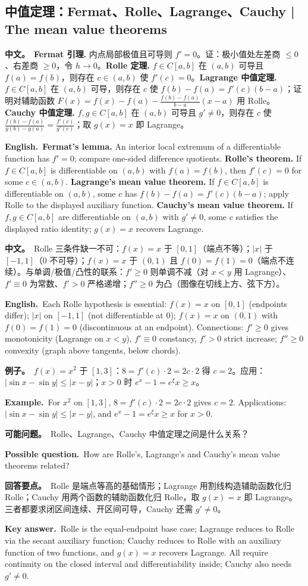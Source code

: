 \documentclass[UTF8,11pt,a4paper]{ctexart}
\newcommand{\BOTH}[2]{\par\noindent\textbf{中文。}\ #1\par\noindent\textbf{English.}\ #2\par}
\newcommand{\EX}[2]{\par\noindent\textbf{例子。}\ #1\par\noindent\textbf{Example.}\ #2\par}
\newcommand{\ASK}[4]{\begin{samepage}\par\noindent\textbf{可能问题。}\ #1\par\noindent\textbf{Possible question.}\ #2\par\noindent\textbf{回答要点。}\ #3\par\noindent\textbf{Key answer.}\ #4\medskip\end{samepage}}
\begin{document}
\subsection{中值定理：Fermat、Rolle、Lagrange、Cauchy | The mean value theorems}
\BOTH{\textbf{Fermat 引理.} 内点局部极值且可导则 $f'=0$。证：极小值处左差商 $\le0$、右差商 $\ge0$，令 $h\to0$。\textbf{Rolle 定理.} $f\in C[a,b]$ 在 $(a,b)$ 可导且 $f(a)=f(b)$，则存在 $c\in(a,b)$ 使 $f'(c)=0$。\textbf{Lagrange 中值定理.} $f\in C[a,b]$ 在 $(a,b)$ 可导，则存在 $c$ 使 $f(b)-f(a)=f'(c)(b-a)$；证明对辅助函数 $F(x)=f(x)-f(a)-\frac{f(b)-f(a)}{b-a}(x-a)$ 用 Rolle。\textbf{Cauchy 中值定理.} $f,g\in C[a,b]$ 在 $(a,b)$ 可导且 $g'\ne0$，则存在 $c$ 使 $\frac{f(b)-f(a)}{g(b)-g(a)}=\frac{f'(c)}{g'(c)}$；取 $g(x)=x$ 即 Lagrange。}{\textbf{Fermat's lemma.} An interior local extremum of a differentiable function has $f'=0$; compare one-sided difference quotients. \textbf{Rolle's theorem.} If $f\in C[a,b]$ is differentiable on $(a,b)$ with $f(a)=f(b)$, then $f'(c)=0$ for some $c\in(a,b)$. \textbf{Lagrange's mean value theorem.} If $f\in C[a,b]$ is differentiable on $(a,b)$, some $c$ has $f(b)-f(a)=f'(c)(b-a)$; apply Rolle to the displayed auxiliary function. \textbf{Cauchy's mean value theorem.} If $f,g\in C[a,b]$ are differentiable on $(a,b)$ with $g'\ne0$, some $c$ satisfies the displayed ratio identity; $g(x)=x$ recovers Lagrange.}
\BOTH{Rolle 三条件缺一不可：$f(x)=x$ 于 $[0,1]$（端点不等）；$|x|$ 于 $[-1,1]$（$0$ 不可导）；$f(x)=x$ 于 $(0,1)$ 且 $f(0)=f(1)=0$（端点不连续）。与单调/极值/凸性的联系：$f'\ge0$ 则单调不减（对 $x<y$ 用 Lagrange）、$f'\equiv0$ 为常数、$f'>0$ 严格递增；$f''\ge0$ 为凸（图像在切线上方、弦下方）。}{Each Rolle hypothesis is essential: $f(x)=x$ on $[0,1]$ (endpoints differ); $|x|$ on $[-1,1]$ (not differentiable at $0$); $f(x)=x$ on $(0,1)$ with $f(0)=f(1)=0$ (discontinuous at an endpoint). Connections: $f'\ge0$ gives monotonicity (Lagrange on $x<y$), $f'\equiv0$ constancy, $f'>0$ strict increase; $f''\ge0$ convexity (graph above tangents, below chords).}
\EX{$f(x)=x^2$ 于 $[1,3]$：$8=f'(c)\cdot2=2c\cdot2$ 得 $c=2$。应用：$|\sin x-\sin y|\le|x-y|$；$x>0$ 时 $e^x-1=e^{\xi}x\ge x$。}{For $x^2$ on $[1,3]$, $8=f'(c)\cdot2=2c\cdot2$ gives $c=2$. Applications: $|\sin x-\sin y|\le|x-y|$, and $e^x-1=e^{\xi}x\ge x$ for $x>0$.}
\ASK{Rolle、Lagrange、Cauchy 中值定理之间是什么关系？}{How are Rolle's, Lagrange's and Cauchy's mean value theorems related?}{Rolle 是端点等高的基础情形；Lagrange 用割线构造辅助函数化归 Rolle；Cauchy 用两个函数的辅助函数化归 Rolle，取 $g(x)=x$ 即 Lagrange。三者都要求闭区间连续、开区间可导，Cauchy 还需 $g'\ne0$。}{Rolle is the equal-endpoint base case; Lagrange reduces to Rolle via the secant auxiliary function; Cauchy reduces to Rolle with an auxiliary function of two functions, and $g(x)=x$ recovers Lagrange. All require continuity on the closed interval and differentiability inside; Cauchy also needs $g'\ne0$.}
\end{document}
